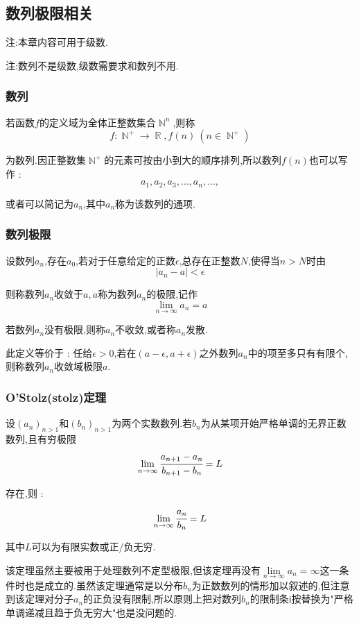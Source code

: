 \documentclass[UTF8,12pt]{ctexbook}
\newcommand{\limNormal}[1]{\lim\limits_{#1}}
\newcommand{\defFunction}[1]{f(#1)}
\newcommand{\absoluteValue}[1]{\left\lvert #1 \right\vert}
\DeclareMathOperator{\mathRealNumberCollection}{\mathbb{R}}
\DeclareMathOperator{\mathNatureNumberCollection}{\mathbb{N}}
\begin{document}
{{\subsection{数列极限相关}{

  注:本章内容可用于级数.

  注:数列不是级数,级数需要求和数列不用.

  \subsubsection{数列}{
    若函数$f$的定义域为全体正整数集合$\mathNatureNumberCollection^n$,则称
    $$
      f : \mathNatureNumberCollection^+ \to \mathRealNumberCollection,\defFunction{n} \ (n \in \mathNatureNumberCollection^+)
    $$

    为数列.因正整数集$\mathNatureNumberCollection^+$的元素可按由小到大的顺序排列,所以数列$\defFunction{n}$也可以写作 :
    $$
      a_1,a_2,a_3,\dots,a_n,\dots,
    $$

    或者可以简记为${a_n}$,其中$a_n$称为该数列的通项.
  }%

  \subsubsection{数列极限}{
    设数列${a_n}$,存在$a_0$,若对于任意给定的正数$\epsilon$,总存在正整数$N$,使得当$n > N$时由
    $$
      \absoluteValue{a_n - a} < \epsilon
    $$

    则称数列${a_n}$收敛于$a,a$称为数列$a_n$的极限,记作
    $$
      \limNormal{n \to \infty}a_n = a
    $$

    若数列${a_n}$没有极限,则称${a_n}$不收敛,或者称${a_n}$发散.

    此定义等价于 : 任给$\epsilon > 0$,若在$(a - \epsilon,a + \epsilon)$之外数列${a_n}$中的项至多只有有限个,则称数列${a_n}$收敛域极限$a$.
  }%

  \subsubsection{O'Stolz(stolz)定理}{
    设$(a_n)_{n > 1}$和$(b_n)_{n > 1}$为两个实数数列.若$b_n$为从某项开始严格单调的无界正数数列,且有穷极限
    $$
      \limNormal{n \to \infty}\cfrac{a_{n + 1} - a_n}{b_{n + 1} - b_n} = L
    $$

    存在,则 :
    $$
      \limNormal{n \to \infty}\cfrac{a_n}{b_n} = L
    $$

    其中$L$可以为有限实数或正/负无穷.

    该定理虽然主要被用于处理数列不定型极限,但该定理再没有$\limNormal{n \to \infty}a_n = \infty$这一条件时也是成立的.虽然该定理通常是以分布$b_n$为正数数列的情形加以叙述的,但注意到该定理对分子$a_n$的正负没有限制,所以原则上把对数列$b_n$的限制条i按替换为"严格单调递减且趋于负无穷大"也是没问题的.

}}}}
\end{document}
